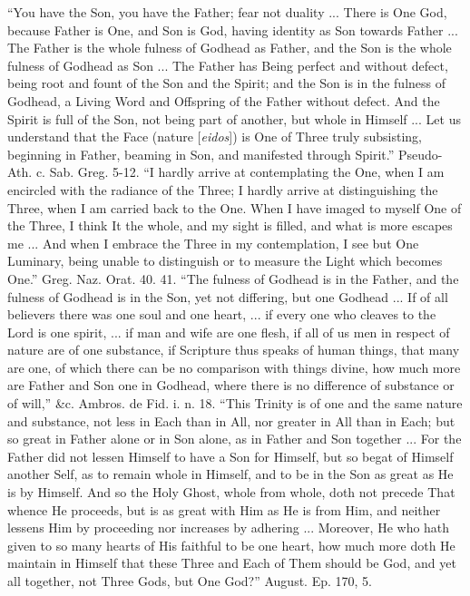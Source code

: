``You have the Son, you have the Father; fear not
duality ... There is One God, because Father is One, and Son is
God, having identity as Son towards Father ... The Father is the whole
fulness of Godhead as Father, and the Son is the whole fulness of
Godhead as Son ... The Father has Being perfect and without defect,
being root and fount of the Son and the Spirit; and the Son is in the
fulness of Godhead, a Living Word and Offspring of the Father without
defect. And the Spirit is full of the Son, not being part of another,
but whole in Himself ... Let us understand that the Face (nature [\emph{eidos}])
is One of Three truly subsisting, beginning in Father, beaming in Son,
and manifested through Spirit.'' Pseudo-Ath. c. Sab. Greg. 5-12. ``I
hardly arrive at contemplating the One, when I am encircled with the
radiance of the Three; I hardly arrive at distinguishing the Three,
when I am carried back to the One. When I have imaged to myself One of
the Three, I think It the whole, and my sight is filled, and what is
more escapes me ... And when I embrace the Three in my contemplation,
I see but One Luminary, being unable to distinguish or to measure the
Light which becomes One.'' Greg. Naz. Orat. 40. 41. ``The fulness of
Godhead is in the Father, and the fulness of Godhead is in the Son,
yet not differing, but one Godhead ... If of all believers there was
one soul and one heart, ... if every one who cleaves to the Lord is
one spirit, ... if man and wife are one flesh, if all of us men in
respect of nature are of one substance, if Scripture thus speaks of
human things, that many are one, of which there can be no comparison
with things divine, how much more are Father and Son one in
Godhead, where there is no difference of substance or of will,''
\&c. Ambros. de Fid. i. n. 18. ``This Trinity is of one and the same
nature and substance, not less in Each than in All, nor greater in All
than in Each; but so great in Father alone or in Son alone, as in
Father and Son together ... For the Father did not lessen Himself to
have a Son for Himself, but so begat of Himself another Self, as to
remain whole in Himself, and to be in the Son as great as He is by
Himself. And so the Holy Ghost, whole from whole, doth not precede
That whence He proceeds, but is as great with Him as He is from Him,
and neither lessens Him by proceeding nor increases by adhering ...
Moreover, He who hath given to so many hearts of His faithful to be
one heart, how much more doth He maintain in Himself that these Three
and Each of Them should be God, and yet all together, not Three Gods,
but One God?'' August. Ep. 170, 5.

